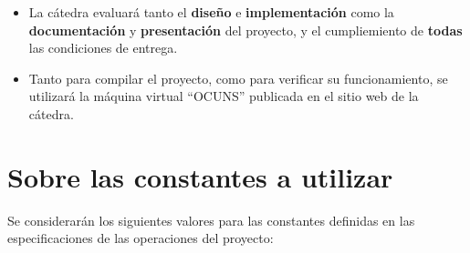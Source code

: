 \documentclass[12pt,a4paper]{article}
\begin{document}
\begin{itemize}
	
	\item La cátedra evaluará tanto el \textbf{diseño} e \textbf{implementación}
	como la \textbf{documentación} y \textbf{presentación} del proyecto, y el cumpliemiento de \textbf{todas} las condiciones de entrega.
	
	\item Tanto para compilar el proyecto, como para verificar su funcionamiento, se utilizará la máquina virtual “OCUNS” publicada en el sitio web de la cátedra.
	
\end{itemize}

\pagebreak

\section*{Sobre las constantes a utilizar}
Se considerarán los siguientes valores para las constantes definidas en las especificaciones de las operaciones del proyecto: \\
\end{document}
